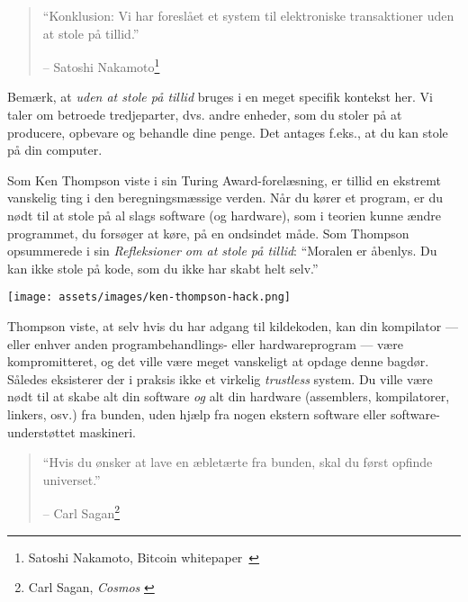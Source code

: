 \begin{quotation}\begin{samepage}
\enquote{Konklusion: Vi har foreslået et system til elektroniske transaktioner
uden at stole på tillid.}
\begin{flushright} -- Satoshi Nakamoto\footnote{Satoshi Nakamoto, Bitcoin whitepaper~\cite{whitepaper}}
\end{flushright}\end{samepage}\end{quotation}

Bemærk, at \textit{uden at stole på tillid} bruges i en meget specifik kontekst
her. Vi taler om betroede tredjeparter, dvs. andre enheder,
som du stoler på at producere, opbevare og behandle dine penge. Det antages f.eks.,
at du kan stole på din computer.

Som Ken Thompson viste i sin Turing Award-forelæsning, er tillid en
ekstremt vanskelig ting i den beregningsmæssige verden. Når du kører et
program, er du nødt til at stole på al slags software (og hardware), som
i teorien kunne ændre programmet, du forsøger at køre, på en ondsindet
måde. Som Thompson opsummerede i sin \textit{Refleksioner om at stole på tillid}:
\enquote{Moralen er åbenlys. Du kan ikke stole på kode, som du ikke har skabt
helt selv.}~\cite{trusting-trust}

\begin{center}
  \texttt{[image: assets/images/ken-thompson-hack.png]}
  \label{fig:ken-thompson-hack}
\end{center}

Thompson viste, at selv hvis du har adgang til kildekoden,
kan din kompilator --- eller enhver anden programbehandlings- eller
hardwareprogram --- være kompromitteret, og det ville være
meget vanskeligt at opdage denne bagdør. Således eksisterer der i praksis ikke
et virkelig \textit{trustless} system. Du ville være nødt til at skabe alt din software \textit{og} alt din
hardware (assemblers, kompilatorer, linkers, osv.) fra bunden,
uden hjælp fra nogen ekstern software eller software-understøttet maskineri.

\begin{quotation}\begin{samepage}
\enquote{Hvis du ønsker at lave en æbletærte fra bunden, skal du først opfinde
universet.}
\begin{flushright} -- Carl Sagan\footnote{Carl Sagan, \textit{Cosmos} \cite{cosmos}}
\end{flushright}\end{samepage}\end{quotation}

